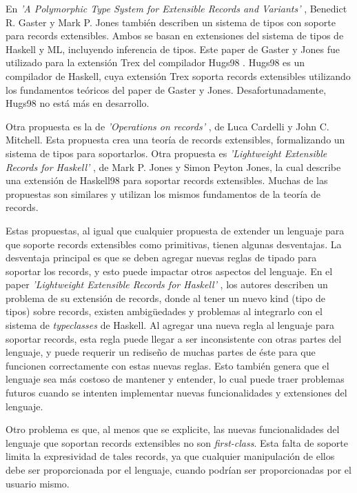 En \textit{'A Polymorphic Type System for Extensible Records and Variants'} \cite{Gaster96apolymorphic}, Benedict R. Gaster y Mark P. Jones también describen un sistema de tipos con soporte para records extensibles. Ambos se basan en extensiones del sistema de tipos de Haskell y ML, incluyendo inferencia de tipos. Este paper de Gaster y Jones fue utilizado para la extensión Trex del compilador Hugs98 \cite{TrexHugsExtension}. Hugs98 es un compilador de Haskell, cuya extensión Trex soporta records extensibles utilizando los fundamentos teóricos del paper de Gaster y Jones. Desafortunadamente, Hugs98 no está más en desarrollo.

Otra propuesta es la de \textit{'Operations on records'} \cite{Cardelli:1990:OR:101514.101515}, de Luca Cardelli y John C. Mitchell. Esta propuesta crea una teoría de records extensibles, formalizando un sistema de tipos para soportarlos. Otra propuesta es \textit{'Lightweight Extensible Records for Haskell'} \cite{Jones99lightweightextensible}, de Mark P. Jones y Simon Peyton Jones, la cual describe una extensión de Haskell98 para soportar records extensibles. Muchas de las propuestas son similares y utilizan los mismos fundamentos de la teoría de records.

Estas propuestas, al igual que cualquier propuesta de extender un lenguaje para que soporte records extensibles como primitivas, tienen algunas desventajas. La desventaja principal es que se deben agregar nuevas reglas de tipado para soportar los records, y esto puede impactar otros aspectos del lenguaje. En el paper \textit{'Lightweight Extensible Records for Haskell'} \cite{Jones99lightweightextensible}, los autores describen un problema de su extensión de records, donde al tener un nuevo kind (tipo de tipos) sobre records, existen ambigüedades y problemas al integrarlo con el sistema de \textit{typeclasses} de Haskell. Al agregar una nueva regla al lenguaje para soportar records, esta regla puede llegar a ser inconsistente con otras partes del lenguaje, y puede requerir un rediseño de muchas partes de éste para que funcionen correctamente con estas nuevas reglas. Esto también genera que el lenguaje sea más costoso de mantener y entender, lo cual puede traer problemas futuros cuando se intenten implementar nuevas funcionalidades y extensiones del lenguaje. 

Otro problema es que, al menos que se explicite, las nuevas funcionalidades del lenguaje que soportan records extensibles no son \textit{first-class}. Esta falta de soporte limita la expresividad de tales records, ya que cualquier manipulación de ellos debe ser proporcionada por el lenguaje, cuando podrían ser proporcionadas por el usuario mismo.

